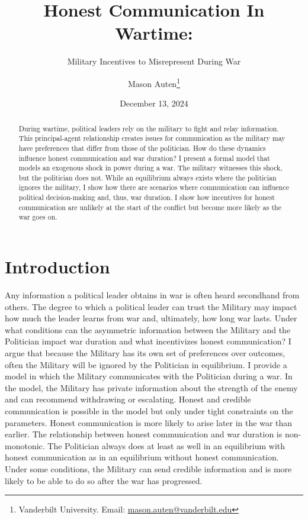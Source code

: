 \documentclass[
  12pt,
]{article}
\title{Honest Communication In Wartime:}
\subtitle{Military Incentives to Misrepresent During War}
\author{Mason
Auten\thanks{Vanderbilt University. Email: \href{mailto:mason.auten@vanderbilt.edu}{mason.auten@vanderbilt.edu}}}
\date{December 13, 2024}
\theoremstyle{plain}
\theoremstyle{plain}
\theoremstyle{remark}
\begin{document}
\maketitle
\begin{abstract}
\noindent \singlespacing During wartime, political leaders rely on the
military to fight and relay information. This principal-agent
relationship creates issues for communication as the military may have
preferences that differ from those of the politician. How do these
dynamics influence honest communication and war duration? I present a
formal model that models an exogenous shock in power during a war. The
military witnesses this shock, but the politician does not. While an
equilibrium always exists where the politician ignores the military, I
show how there are scenarios where communication can influence political
decision-making and, thus, war duration. I show how incentives for
honest communication are unlikely at the start of the conflict but
become more likely as the war goes on.
\end{abstract}


\section{Introduction}\label{introduction}

Any information a political leader obtains in war is often heard
secondhand from others. The degree to which a political leader can trust
the Military may impact how much the leader learns from war and,
ultimately, how long war lasts. Under what conditions can the asymmetric
information between the Military and the Politician impact war duration
and what incentivizes honest communication? I argue that because the
Military has its own set of preferences over outcomes, often the
Military will be ignored by the Politician in equilibrium. I provide a
model in which the Military communicates with the Politician during a
war. In the model, the Military has private information about the
strength of the enemy and can recommend withdrawing or escalating.
Honest and credible communication is possible in the model but only
under tight constraints on the parameters. Honest communication is more
likely to arise later in the war than earlier. The relationship between
honest communication and war duration is non-monotonic. The Politician
always does at least as well in an equilibrium with honest communication
as in an equilibrium without honest communication. Under some
conditions, the Military can send credible information and is more
likely to be able to do so after the war has progressed.
\end{document}
